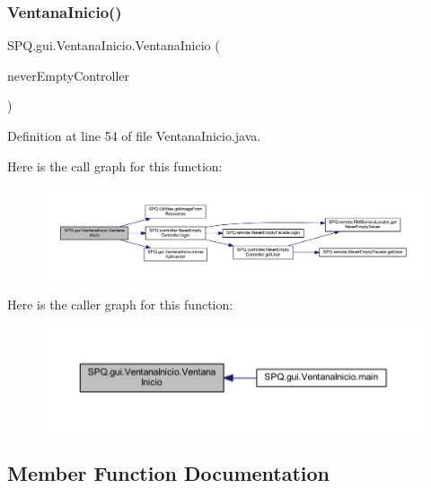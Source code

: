 \subsubsection{\texorpdfstring{Ventana\+Inicio()}{VentanaInicio()}}
{\footnotesize\ttfamily S\+P\+Q.\+gui.\+Ventana\+Inicio.\+Ventana\+Inicio (\begin{DoxyParamCaption}\item[{\mbox{\hyperlink{class_s_p_q_1_1controller_1_1_never_empty_controller}{Never\+Empty\+Controller}}}]{never\+Empty\+Controller }\end{DoxyParamCaption})}



Definition at line 54 of file Ventana\+Inicio.\+java.

Here is the call graph for this function\+:
\nopagebreak
\begin{figure}[H]
\begin{center}
\leavevmode
\includegraphics[width=350pt]{class_s_p_q_1_1gui_1_1_ventana_inicio_ab74166cbe23810e4b8586849fb86b54e_cgraph}
\end{center}
\end{figure}
Here is the caller graph for this function\+:
\nopagebreak
\begin{figure}[H]
\begin{center}
\leavevmode
\includegraphics[width=350pt]{class_s_p_q_1_1gui_1_1_ventana_inicio_ab74166cbe23810e4b8586849fb86b54e_icgraph}
\end{center}
\end{figure}


\subsection{Member Function Documentation}
\mbox{\label{class_s_p_q_1_1gui_1_1_ventana_inicio_a0588d157580852e153c5dd2291645173}} 
